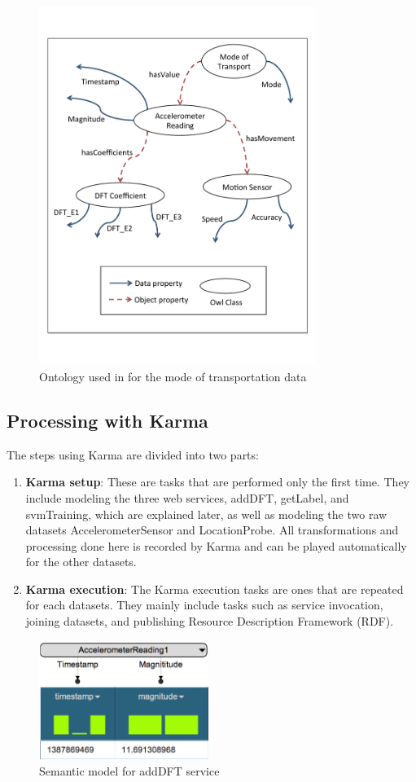 \begin{figure}[h]
\centering
\includegraphics[width=90mm]{img/ontology.pdf}
\caption{Ontology used in for the mode of transportation data\label{fig:ontology}}
\end{figure}

\subsection{Processing with Karma}
The steps using Karma are divided into two parts:
\begin{enumerate}
  \item \textbf{Karma setup}: These are tasks that are performed only the first time. They include modeling the three web services, addDFT, getLabel, and svmTraining, which are explained later, as well as modeling the two raw datasets AccelerometerSensor and LocationProbe. All transformations and processing done here is recorded by Karma and can be played automatically for the other datasets. 
  \item \textbf{Karma execution}: The Karma execution tasks are ones that are repeated for each datasets. They mainly include tasks such as service invocation, joining datasets, and publishing Resource Description Framework (RDF).
\end{enumerate} 

\begin{figure}[h]
\centering
\includegraphics[width=55mm]{img/DFTservice}
\caption{Semantic model for addDFT service\label{fig:dftService}}
\end{figure}

